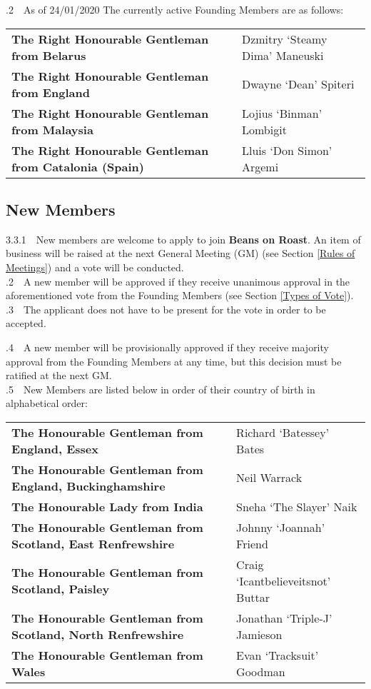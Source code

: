 \documentclass[a4paper,11pt]{article}
\begin{document}
.2$\quad$As of 24/01/2020 The currently active Founding Members are as follows: 

\begin{table}[h!]
\begin{tabular}{ll}
\textbf{The Right Honourable Gentleman from Belarus} & Dzmitry `Steamy Dima'  Maneuski \\
\textbf{The Right Honourable Gentleman from England} & Dwayne `Dean' Spiteri \\
\textbf{The Right Honourable Gentleman from Malaysia} & Lojius `Binman' Lombigit \\
\textbf{The Right Honourable Gentleman from Catalonia (Spain)} & Lluis `Don Simon' Argemi \\
\end{tabular}
\end{table}

\subsection{New Members}
\label{New Members}
3.3.1$\quad$New members are welcome to apply to join \textbf{Beans on Roast}. An item of business will be raised at the next General Meeting (GM) (see Section \ref{Rules of Meetings}) and a vote will be conducted.\\ 

.2$\quad$A new member will be approved if they receive unanimous approval in the aforementioned vote from the Founding Members (see Section \ref{Types of Vote}). \\

.3$\quad$The applicant does not have to be present for the vote in order to be accepted. 

.4$\quad$A new member will be provisionally approved if they receive majority approval from the Founding Members at any time, but this decision must be ratified at the next GM. \\

.5$\quad$New Members are listed below in order of their country of birth in alphabetical order: 
\begin{table}[h!]
\begin{tabular}{ll}
\textbf{The Honourable Gentleman from England, Essex} & Richard `Batessey' Bates\\
\textbf{The Honourable Gentleman from England, Buckinghamshire} & Neil Warrack\\
\textbf{The Honourable Lady from India} & Sneha `The Slayer' Naik \\
\textbf{The Honourable Gentleman from  Scotland, East Renfrewshire} & Johnny `Joannah' Friend \\
\textbf{The Honourable Gentleman from Scotland, Paisley} & Craig `Icantbelieveitsnot' Buttar\\
\textbf{The Honourable Gentleman from Scotland, North Renfrewshire} & Jonathan `Triple-J' Jamieson\\
\textbf{The Honourable Gentleman from Wales} & Evan `Tracksuit' Goodman\\
\end{tabular}
\end{table}
\end{document}
